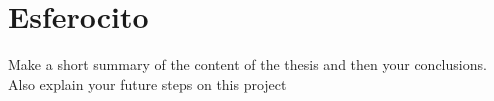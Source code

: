 
\section{Esferocito}
\label{section:Res_Esferocito}
Make a short summary of the content of the thesis and then your conclusions. Also explain your future steps on this project 

%
%